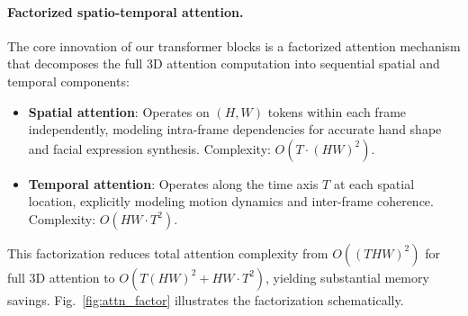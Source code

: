 \documentclass{ieeeaccess}
\begin{document}
\paragraph{Factorized spatio-temporal attention.} The core innovation of our transformer blocks is a factorized attention mechanism that decomposes the full 3D attention computation into sequential spatial and temporal components:
\begin{itemize}
    \item \textbf{Spatial attention}: Operates on $(H, W)$ tokens within each frame independently, modeling intra-frame dependencies for accurate hand shape and facial expression synthesis. Complexity: $O(T \cdot (HW)^2)$.
    \item \textbf{Temporal attention}: Operates along the time axis $T$ at each spatial location, explicitly modeling motion dynamics and inter-frame coherence. Complexity: $O(HW \cdot T^2)$.
\end{itemize}
This factorization reduces total attention complexity from $O((THW)^2)$ for full 3D attention to $O(T(HW)^2 + HW \cdot T^2)$, yielding substantial memory savings. Fig.~\ref{fig:attn_factor} illustrates the factorization schematically.
\end{document}
